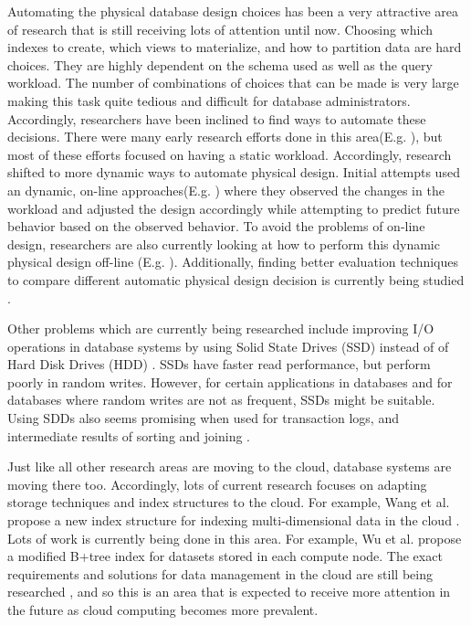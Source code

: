 \documentclass[12pt,a4paper]{article}
\begin{document}
Automating the physical database design choices has been a very attractive area of research that is still receiving lots of attention until now. Choosing which
indexes to create, which views to materialize, and how to partition data are hard choices. They are highly dependent on the schema used as well
as the query workload. The number of combinations of choices that can be made is very large making this task quite tedious and difficult for database
administrators. Accordingly, researchers have been inclined to find ways to automate these decisions. There were many early research efforts done in this
area(E.g. \cite{finkelstein1988physical, hammer76selec, frank1992selec, chaudhuri1997overview, schiefer1999db2, valentin2000select}), but most of these efforts
focused on having a static workload. Accordingly, research shifted to more dynamic ways to automate physical design. Initial attempts used an dynamic, on-line
approaches(E.g. \cite{bruno2007online, sattler2003, schnaitter2007}) where they observed the changes in the workload and adjusted the design accordingly while
attempting to predict future behavior based on the observed behavior. To avoid the problems of on-line design, researchers are also currently looking at how to
perform this dynamic physical design off-line (E.g. \cite{hannes2008,agrawal2006}). Additionally, finding better evaluation techniques to compare different
automatic physical design decision is currently being studied \cite{gebaly2008}.

Other problems which are currently being researched include improving I/O operations in database systems by using Solid State Drives (SSD) instead of of Hard
Disk Drives (HDD) \cite{lee2009, du2009, lee2008}. SSDs have faster read performance, but perform poorly in random writes. However, for certain applications in
databases and for databases where random writes are not as frequent, SSDs might be suitable. Using SDDs also seems promising when used for
transaction logs, and intermediate results of sorting and joining \cite{lee2008}.

Just like all other research areas are moving to the cloud, database systems are moving there too. Accordingly, lots of current research focuses on adapting
storage techniques and index structures to the cloud. For example, Wang et al. propose a new index structure for indexing multi-dimensional data in the
cloud \cite{wang2010indexing}. Lots of work is currently being done in this area. For example, Wu et al. \cite{wu2010efficient} propose a modified B+tree index
for datasets stored in each compute node. The exact requirements and solutions for data management in the cloud are still being
researched \cite{abadi2009data}, and so this is an area that is expected to receive more attention in the future as cloud computing becomes more prevalent.
\end{document}
